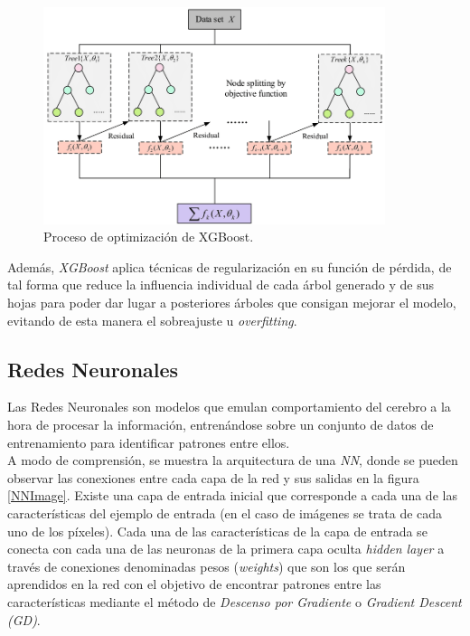             \begin{figure}[h]
                \centering
                \includegraphics[width=10cm]{archivos/XGBoostFlowImage}
                \caption{Proceso de optimización de XGBoost.}
                \label{XGBoostFlowImage}
             \end{figure}

            
            Además, \textit{XGBoost} aplica técnicas de regularización en su función de pérdida, de tal forma que reduce la influencia individual de cada árbol generado y de sus hojas para poder dar lugar a posteriores árboles que consigan mejorar el modelo, evitando de esta manera el sobreajuste u \textit{overfitting}.



        \subsection {Redes Neuronales}

            Las Redes Neuronales \cite{NNReview} son modelos que emulan comportamiento del cerebro a la hora de procesar la información, entrenándose sobre un conjunto de datos de entrenamiento para identificar patrones entre ellos.\\

            A modo de comprensión, se muestra la arquitectura de una \textit{NN}, donde se pueden observar las conexiones entre cada capa de la red y sus salidas en la figura \ref{NNImage}. Existe una capa de entrada inicial que corresponde a cada una de las características del ejemplo de entrada (en el caso de imágenes se trata de cada uno de los píxeles). Cada una de las características de la capa de entrada se conecta con cada una de las neuronas de la primera capa oculta \textit{hidden layer} a través de conexiones denominadas pesos (\textit{weights}) que son los que serán aprendidos en la red con el objetivo de encontrar patrones entre las características mediante el método de \textit{Descenso por Gradiente} o \textit{Gradient Descent (GD)}.\\



